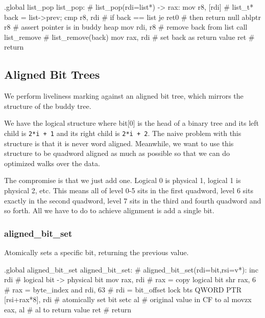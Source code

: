 \begin{asm}
.global list_pop
list_pop:				    # list_pop(rdi=list*) -> rax:
	mov	r8, [rdi]		    #   list_t* back = list->prev;
	cmp	r8, rdi			    #   if back == list
	je	ret0			    #   then return null
	ablptr	r8                          #   assert pointer is in buddy heap
	mov	rdi, r8			    #   remove back from list
	call	list_remove		    #   list_remove(back)
	mov	rax, rdi		    #   set back as return value
	ret				    #   return
\end{asm}

\subsection{Aligned Bit Trees}

We perform liveliness marking against an aligned bit tree, which mirrors the
structure of the buddy tree.

We have the logical structure where bit[0] is the head of a binary tree and its
left child is \lstinline|2*i + 1| and its right child is \lstinline|2*i + 2|.
The naive problem with this structure is that it is never word
aligned. Meanwhile, we want to use this structure to be quadword aligned as
much as possible so that we can do optimized walks over the data.

The compromise is that we just add one. Logical 0 is physical 1, logical 1 is
physical 2, etc. This means all of level 0-5 sits in the first quadword, level
6 sits exactly in the second quadword, level 7 sits in the third and fourth
quadword and so forth. All we have to do to achieve alignment is add a single
bit.

\subsubsection{aligned\_bit\_set}

Atomically sets a specific bit, returning the previous value.

\begin{asm}
.global aligned_bit_set
aligned_bit_set:			    # aligned_bit_set(rdi=bit,rsi=v*):
	inc	rdi			    #   logical bit -> physical bit
	mov	rax, rdi		    #   rax = copy logical bit
	shr	rax, 6			    #   rax = byte_index
	and	rdi, 63			    #   rdi = bit_offset
	lock bts QWORD PTR [rsi+rax*8], rdi #   atomically set bit
	setc	al			    #   original value in CF to al
	movzx	eax, al			    #   al to return value
	ret				    #   return
\end{asm}

